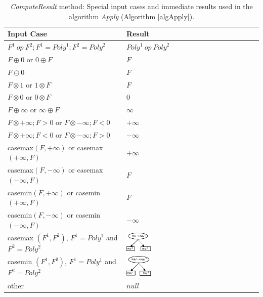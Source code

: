 \documentclass[twoside,11pt]{article}
\begin{document}
\begin{table}[!h]
\begin{center}
    \begin{tabular}{|l|l|l|}
	 \hline
	 Input Case & Result \\ \hline \hline
      $F^1\ \mathit{op}\ F^2; F^1=\mathit{Poly}^1; F^2=\mathit{Poly}^2$ & $\mathit{Poly}^1\ \mathit{op}\ \mathit{Poly}^2$ \\
	 \hline
          $F \oplus 0$ or $0 \oplus F$ & $F$\\
	 \hline
         $F  \ominus 0$ & $F$\\
	 \hline
         $F  \otimes 1$ or $1  \otimes F$ & $F$\\
	 \hline
         $F  \otimes 0$ or $0  \otimes F$ & $0$\\
	 \hline
          $F \oplus \infty $ or $\infty \oplus F $ & $\infty$\\
	 \hline
          $F  \otimes +\infty ; F > 0$ or $F  \otimes -\infty ; F < 0$  & $+\infty$\\
      \hline
          $F  \otimes +\infty ; F < 0$ or $F  \otimes -\infty ; F > 0$  & $-\infty$\\
	 \hline
          casemax$(F, +\infty)$ or casemax$(+\infty, F)$  & $+\infty$\\
	 \hline
          casemax$(F, -\infty)$ or casemax$(-\infty, F)$  & $F$\\
	 \hline
	      casemin$(F, +\infty)$ or casemin$(+\infty, F)$  & $F$\\
	 \hline
          casemin$(F, -\infty)$ or casemin$(-\infty, F)$  & $-\infty$\\
           \hline
          casemax $(F^1  , F^2)$, $F^1=Poly^1$ and $F^2=Poly^2$   &\hspace{3mm} \includegraphics[width=0.20\textwidth]{FiguresSource/max_result.eps}\\
	 \hline
          casemin $(F^1, F^2)$, $F^1=Poly^1$ and $F^2=Poly^2$ &\hspace{3mm}  \includegraphics[width=0.20\textwidth]{FiguresSource/min_result.eps}\\
	 \hline
	  other& $\mathit{null}$\\
         \hline
    \end{tabular}
  \caption{\emph{ComputeResult} method: Special input cases and immediate results used in the algorithm \emph{Apply} (Algorithm \ref{algApply}).
  }
  \label{tab:ComputeResultXADD}
\end{center}
\end{table}
\end{document}
